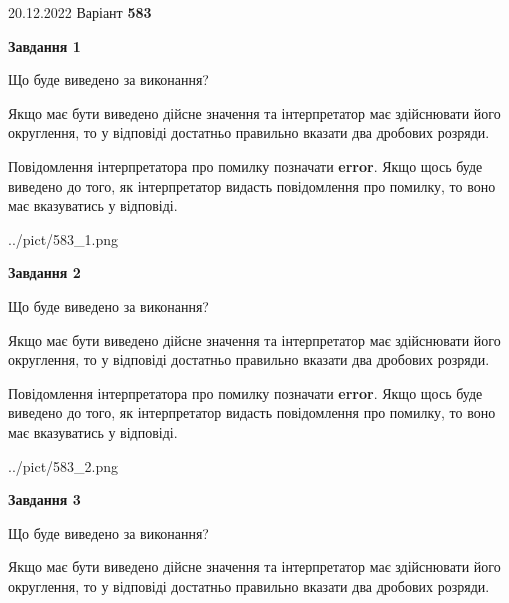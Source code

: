 \documentclass[12pt, ukrainian]{article}
\begin{document}
{20.12.2022 Варіант \No \textbf { 583 }\par}
{
\begin {Large}

{\begin {center}\textbf{Завдання 1}\end {center}}\par
Що буде виведено за виконання? \par

Якщо має бути виведено дійсне значення та інтерпретатор має здійснювати його округлення, 
то у відповіді достатньо правильно вказати два дробових розряди.

Повідомлення інтерпретатора про помилку позначати \textbf{error}.
Якщо щось буде виведено до того, як інтерпретатор видасть повідомлення про помилку, 
то воно має вказуватись у відповіді. \par

\begin{center}
	{../pict/583_1.png}
\end{center}
\newpage

{\begin {center}\textbf{Завдання 2}\end {center}}\par
Що буде виведено за виконання? \par

Якщо має бути виведено дійсне значення та інтерпретатор має здійснювати його округлення, 
то у відповіді достатньо правильно вказати два дробових розряди.

Повідомлення інтерпретатора про помилку позначати \textbf{error}.
Якщо щось буде виведено до того, як інтерпретатор видасть повідомлення про помилку, 
то воно має вказуватись у відповіді. \par

\begin{center}
	{../pict/583_2.png}
\end{center}
\newpage

{\begin {center}\textbf{Завдання 3}\end {center}}\par
Що буде виведено за виконання? \par

Якщо має бути виведено дійсне значення та інтерпретатор має здійснювати його округлення, 
то у відповіді достатньо правильно вказати два дробових розряди.


\end{Large}}
\end{document}
